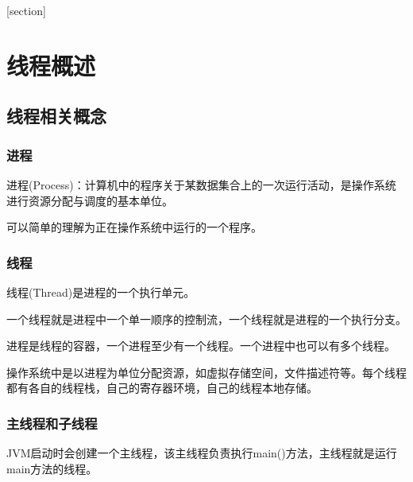 \documentclass[a4paper]{report}
\begin{document}
\flushbottom%
\newcommand{\dm}[1]{\colorbox{wgray}{\lstinline`#1`}}
\newcommand{\myroman}[1]{\uppercase\expandafter{\romannumeral#1}}
[section] \renewcommand{\thenum}{\arabic{num}.} \newcommand{\num}{\refstepcounter{num}\text{\thenum}}

\newenvironment{tips}{\kaishu\zihao{-6}\color{blue}{\noindent\rule[-3pt]{\textwidth}{0.5pt}\par \em \noindent {\zihao{-5} \textcolor[rgb]{1.00,0.00,0.00}{Tips}}}\par}{\\ \rule[3mm]{\textwidth}{0.5pt}\par}

\newenvironment{zhengming}{\kaishu\zihao{-5}\color{blue}{\noindent\em 证明：}\par}{\hfill $\diamondsuit$\par}

\tableofcontents
{}%
\clearpage
{}%

\chapter{线程概述}
\section{线程相关概念}
\subsection{进程}
进程(Process)：计算机中的程序关于某数据集合上的一次运行活动，是操作系统进行资源分配与调度的基本单位。

可以简单的理解为正在操作系统中运行的一个程序。

\subsection{线程}
线程(Thread)是进程的一个执行单元。

一个线程就是进程中一个单一顺序的控制流，一个线程就是进程的一个执行分支。

进程是线程的容器，一个进程至少有一个线程。一个进程中也可以有多个线程。

操作系统中是以进程为单位分配资源，如虚拟存储空间，文件描述符等。每个线程都有各自的线程栈，自己的寄存器环境，自己的线程本地存储。

\subsection{主线程和子线程}
JVM启动时会创建一个主线程，该主线程负责执行main()方法，主线程就是运行main方法的线程。
\end{document}
